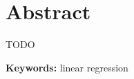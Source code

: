 \thispagestyle{empty}
\section*{Abstract}
TODO

\begin{flushleft}
  \textbf{Keywords:} linear regression
\end{flushleft}